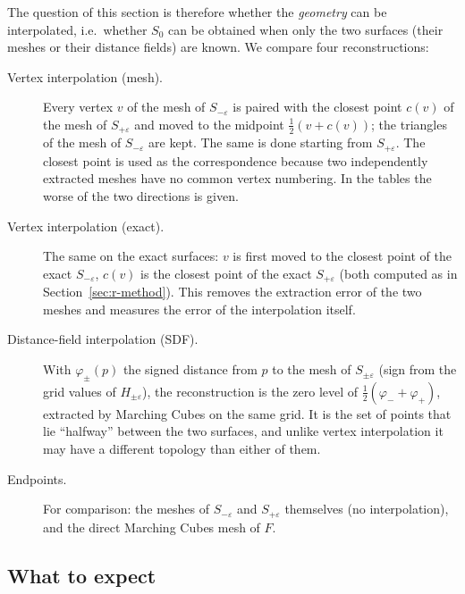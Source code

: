 \documentclass[12pt, a4paper]{article}
\theoremstyle{plain}
\theoremstyle{definition}
\theoremstyle{remark}
\theoremstyle{definition}
\begin{document}
The question of this section is therefore whether the \emph{geometry} can be
interpolated, i.e.\ whether $S_0$ can be obtained when only the two surfaces (their
meshes or their distance fields) are known. We compare four reconstructions:
\begin{description}
    \item[Vertex interpolation (mesh).] Every vertex $v$ of the mesh of
          $S_{-\varepsilon}$ is paired with the closest point $c(v)$ of the mesh of
          $S_{+\varepsilon}$ and moved to the midpoint $\tfrac12(v+c(v))$; the
          triangles of the mesh of $S_{-\varepsilon}$ are kept. The same is done
          starting from $S_{+\varepsilon}$. The closest point is used as the
          correspondence because two independently extracted meshes have no common
          vertex numbering. In the tables the worse of the two directions is given.
    \item[Vertex interpolation (exact).] The same on the exact surfaces: $v$ is
          first moved to the closest point of the exact $S_{-\varepsilon}$, $c(v)$ is
          the closest point of the exact $S_{+\varepsilon}$ (both computed as in
          Section~\ref{sec:r-method}). This removes the extraction error of the two
          meshes and measures the error of the interpolation itself.
    \item[Distance-field interpolation (SDF).] With $\varphi_\pm(p)$ the signed
          distance from $p$ to the mesh of $S_{\pm\varepsilon}$ (sign from the grid
          values of $H_{\pm\varepsilon}$), the reconstruction is the zero level of
          $\tfrac12(\varphi_-+\varphi_+)$, extracted by Marching Cubes on the same
          grid. It is the set of points that lie ``halfway'' between the two
          surfaces, and unlike vertex interpolation it may have a different topology
          than either of them.
    \item[Endpoints.] For comparison: the meshes of $S_{-\varepsilon}$ and
          $S_{+\varepsilon}$ themselves (no interpolation), and the direct Marching
          Cubes mesh of $F$.
\end{description}

\subsection{What to expect}
\label{sec:r-interp-theory}
\end{document}
